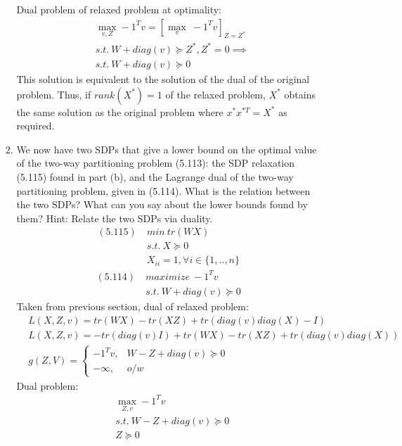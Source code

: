 \documentclass[12pt,letter]{article}
\begin{document}
\begin{enumerate}
\begin{enumerate}
\begin{enumerate}
    Dual problem of relaxed problem at optimality:
    \begin{align*}
      &\max_{v,Z} -1^T v = [\max_{v}\ -1^T v]_{Z=Z^*}\\
      &s.t.\ W + diag(v) \succeq Z^*, Z^*=0 \implies \\
      &s.t.\ W + diag(v) \succeq 0
    \end{align*}
    This solution is equivalent to the solution of the dual of the original problem. Thus, if $rank(X^*)=1$ of the relaxed problem, $X^*$ obtains the same solution as the original problem where $x^*x^{*T}=X^*$ as required.
    \pagebreak
  \item
    We now have two SDPs that give a lower bound on the optimal value of the two-way partitioning problem (5.113): the SDP relaxation (5.115) found in part (b), and the Lagrange dual of the two-way partitioning problem, given in (5.114). What is the relation between the two SDPs? What can you say about the lower bounds found by them? Hint: Relate the two SDPs via duality.
    \begin{align*}
      (5.115)\ &min\ tr(W X)\\
               &s.t.\ X \succeq 0\\
               &X_{ii} = 1, \forall i \in \{1,..,n\}
    \end{align*}
    \begin{align*}
      (5.114)\ &maximize\ -1^T v\\
               &s.t.\ W + diag(v) \succeq 0
    \end{align*}    
    Taken from previous section, dual of relaxed problem:
    \begin{align*}
      &L(X,Z,v) = tr(WX) - tr(XZ) + tr(diag(v)diag(X)-I)\\
      &L(X,Z,v) = -tr(diag(v)I) + tr(WX) - tr(XZ) + tr(diag(v)diag(X))\\
      &g(Z,V) =
        \begin{cases}
          -1^T v ,& W - Z + diag(v) \succeq 0\\
          -\infty ,& o/w
        \end{cases}
    \end{align*}
    Dual problem:
    \begin{align*}
      &\max_{Z,v} -1^T v\\
      &s.t.\ W - Z + diag(v) \succeq 0\\
        &Z \succeq 0
      \end{align*}


\end{enumerate}
\end{enumerate}
\end{enumerate}
\end{document}
